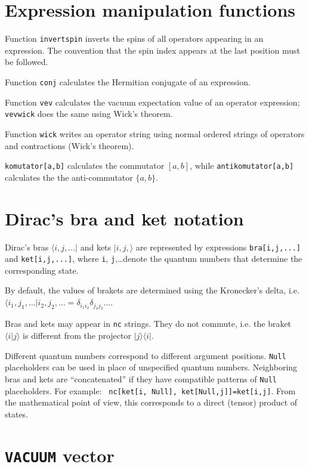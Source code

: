 \documentclass[a4paper,10pt,openany]{book}
\begin{document}
\section{Expression manipulation functions}

Function {\tt invertspin} inverts the spins of all operators appearing
in an expression. The convention that the spin index appears at the
last position must be followed.

Function {\tt conj} calculates the Hermitian conjugate of an expression.

Function {\tt vev} calculates the vacuum expectation value of an operator
expression; {\tt vevwick} does the same using Wick's theorem.

Function {\tt wick} writes an operator string using normal ordered
strings of operators and contractions (Wick's theorem).

{\tt komutator[a,b]} calculates the commutator $[a,b]$, while
{\tt antikomutator[a,b]} calculates the the anti-commutator $\{a,b\}$.


\section{Dirac's bra and ket notation}
\label{dirac}

Dirac's bras $\langle i,j,\ldots|$ and kets $|i,j,\rangle$ are
represented by expressions {\tt bra[i,j,...]}  and {\tt ket[i,j,...]},
where {\tt i}, {\tt j},\ldots denote the quantum numbers that
determine the corresponding state.

By default, the values of brakets are determined using the Kronecker's
delta, i.e. $\langle i_1, j_1,\ldots | i_2, j_2, \ldots =
\delta_{i_1i_2} \delta_{j_1j_2} \ldots$.

Bras and kets may appear in {\tt nc} strings. They do not commute,
i.e. the braket $\langle i|j \rangle$ is different from the projector
$|j\rangle \langle i|$.

Different quantum numbers correspond to different argument positions.
{\tt Null} placeholders can be used in place of unspecified quantum
numbers. Neighboring bras and kets are ``concatenated'' if they have
compatible patterns of {\tt Null} placeholders. For example: {\tt
  nc[ket[i, Null], ket[Null,j]]=ket[i,j]}. From the mathematical point
of view, this corresponds to a direct (tensor) product of states.


\section{{\tt VACUUM} vector}
\end{document}
